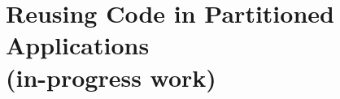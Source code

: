 \declarecommand{\sysname}{\civet{}}

\chapter{Reusing Code in Partitioned Applications\\ (in-progress work)}
\label{chap:civet}







%


